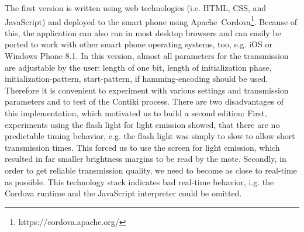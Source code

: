 \documentclass{sig-alternate} %
\begin{document}
The first version is written using web technologies (i.e. HTML, CSS, and JavaScript) and deployed to the smart phone using Apache~Cordova\footnote{https://cordova.apache.org/}.
Because of this, the application can also run in most desktop browsers and can easily be ported to work with other smart phone operating systems, too, e.g. iOS or Windows Phone 8.1.
In this version, almost all parameters for the transmission are adjustable by the user: length of one bit, length of initialization phase, initialization-pattern, start-pattern, if hamming-encoding should be used.
Therefore it is convenient to experiment with various settings and transmission parameters and to test of the Contiki process.
There are two disadvantages of this implementation, which motivated us to build a second edition:
First, experiments using the flash light for light emission showed, that there are no predictable timing behavior, e.g. the flash light was simply to slow to allow short transmission times.
This forced us to use the screen for light emission, which resulted in far smaller brightness margins to be read by the mote.
Secondly, in order to get reliable transmission quality, we need to become as close to real-time as possible.
This technology stack indicates bad real-time behavior, i.g. the Cordova runtime and the JavaScript interpreter could be omitted.

\end{document}
